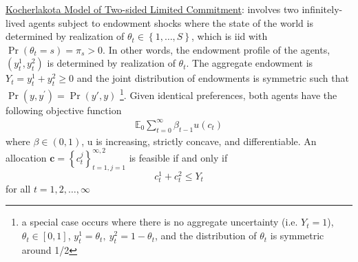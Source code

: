 \documentclass{article}
\begin{document}
\vspace{2.5mm}
\par \underline{Kocherlakota Model of Two-sided Limited Commitment}: involves two infinitely-lived agents subject to endowment shocks where the state of the world is determined by realization of $\theta_{t} \in \left\{ 1, \dots, S \right\}$, which is iid with $\Pr (\theta_{t} = s) = \pi_{s} > 0$. In other words, the endowment profile of the agents, $(y_{t}^{1}, y_{t}^{2})$ is determined by realization of $\theta_{t}$.
The aggregate endowment is $Y_{t} = y_{t}^{1} + y_{t}^{2} \geq 0$ and the joint distribution of endowments is symmetric such that $\Pr(y, y^{'}) = \Pr(y', y)$ \footnote{a special case occurs where there is no aggregate uncertainty (i.e. $Y_{t} = 1$), $\theta_{t} \in [0,1]$, $y_{t}^{1} = \theta_{t}, \ y_{t}^{2} = 1 - \theta_{t}$, and the distribution of $\theta_{t}$ is symmetric around 1/2}.
Given identical preferences, both agents have the following objective function
\begin{gather*}
\mathbb{E}_{0} \sum_{t=0}^{\infty}\beta_{t-1}u(c_{t})
\end{gather*}
where $\beta \in (0,1)$, u is increasing, strictly concave, and differentiable.
An allocation $\textbf{c} = \left\{ c_{t}^{j}\right\}_{t=1, j=1}^{\infty, 2}$ is feasible if and only if $$c_{t}^{1} + c_{t}^{2} \leq Y_{t}$$ for all $t = 1, 2, \dots, \infty$
\end{document}

